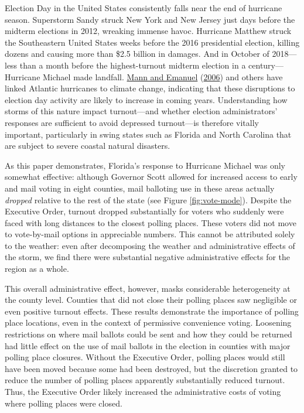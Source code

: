 \documentclass[
  12pt,
]{article}
\begin{document}
Election Day in the United States consistently falls near the end of hurricane season. Superstorm Sandy struck New York and New Jersey just days before the midterm elections in 2012, wreaking immense havoc. Hurricane Matthew struck the Southeastern United States weeks before the 2016 presidential election, killing dozens and causing more than \$2.5 billion in damages. And in October of 2018---less than a month before the highest-turnout midterm election in a century---Hurricane Michael made landfall. \protect\hyperlink{ref-Mann2006}{Mann and Emanuel} (\protect\hyperlink{ref-Mann2006}{2006}) and others have linked Atlantic hurricanes to climate change, indicating that these disruptions to election day activity are likely to increase in coming years. Understanding how storms of this nature impact turnout---and whether election administrators' responses are sufficient to avoid depressed turnout---is therefore vitally important, particularly in swing states such as Florida and North Carolina that are subject to severe coastal natural disasters.

As this paper demonstrates, Florida's response to Hurricane Michael was only somewhat effective: although Governor Scott allowed for increased access to early and mail voting in eight counties, mail balloting use in these areas actually \emph{dropped} relative to the rest of the state (see Figure \ref{fig:vote-mode}). Despite the Executive Order, turnout dropped substantially for voters who suddenly were faced with long distances to the closest polling places. These voters did not move to vote-by-mail options in appreciable numbers. This cannot be attributed solely to the weather: even after decomposing the weather and administrative effects of the storm, we find there were substantial negative administrative effects for the region as a whole.

This overall administrative effect, however, masks considerable heterogeneity at the county level. Counties that did not close their polling places saw negligible or even positive turnout effects. These results demonstrate the importance of polling place locations, even in the context of permissive convenience voting. Loosening restrictions on where mail ballots could be sent and how they could be returned had little effect on the use of mail ballots in the election in counties with major polling place closures. Without the Executive Order, polling places would still have been moved because some had been destroyed, but the discretion granted to reduce the number of polling places apparently substantially reduced turnout. Thus, the Executive Order likely increased the administrative costs of voting where polling places were closed.
\end{document}
